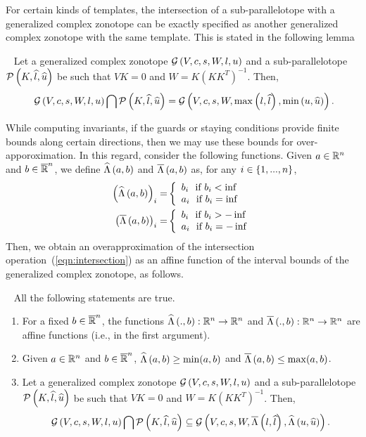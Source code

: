 For certain kinds of templates, the intersection of a
sub-parallelotope with a generalized complex zonotope can be exactly
specified as another generalized complex zonotope with the same
template.  This is stated in the following lemma 
\begin{lemma}~\label{lem:intersection}
  Let a generalized complex zonotope $\mathcal{G}\left(V,c,s,W,l,u\right)$ and a sub-parallelotope
  $\mathcal{P}\left(K,\widehat{l},\widehat{u}\right)$ be such that $VK=0$ and
  $W=K(KK^T)^{-1}$.  Then, 
\begin{equation}~\label{eqn:intersection}
\mathcal{G}\left(V,c,s,W,l,u\right)\bigcap \mathcal{P}\left(K,\widehat{l},\widehat{u}\right) =
  \mathcal{G}\left(V,c,s,W,\max\left(l,\widehat{l}\right),\min\left(u,\widehat{u}\right)\right).
\end{equation}
\end{lemma}

While computing invariants, if the guards or staying conditions
provide finite bounds along certain directions, then we may use these
bounds for over-apporoximation.  In this regard, consider the
following functions.  Given $a\in\mathbb{R}^n$ and $b\in\mathbb{\overline{R}}^n$,
we define $\widehat{\Lambda}\left(a,b\right)$ and $\overline{\Lambda}\left(a,b\right)$ as, for any
$i\in\{1,...,n\}$,
\begin{align}
\left(\widehat{\Lambda}\left(a,b\right)\right)_i= & \left\{
\begin{array}{l}
b_i~~\text{if}~b_i<\inf\\
a_i~~\text{if}~b_i=\inf
\end{array}
\right.\\
\left(\overline{\Lambda}\left(a,b\right)\right)_i= &\left\{
\begin{array}{l}
b_i~~\text{if}~b_i>-\inf\\
a_i~~\text{if}~b_i=-\inf
\end{array}
\right.
\end{align}
%
Then, we obtain an overapproximation of the intersection
operation~(\ref{eqn:intersection}) as an affine function of the
interval bounds of the generalized complex zonotope, as follows.
\begin{lemma}~\label{lem:affineapproximation}
All the following statements are true.
\begin{enumerate}
\item For a fixed $b\in\mathbb{\overline{R}}^n$, the functions
  $\widehat{\Lambda}\left(.,b\right):\mathbb{R}^n\rightarrow\mathbb{R}^n$ and
  $\overline{\Lambda}\left(.,b\right):\mathbb{R}^n\rightarrow\mathbb{R}^n$ are affine functions
  (i.e., in
  the first argument).
\item Given $a\in\mathbb{R}^n$ and $b\in\mathbb{\overline{R}}^n$,
  $\widehat{\Lambda}\left(a,b\right)\geq \min(a,b)$ and $\overline{\Lambda}\left(a,b\right)\leq
  \max(a,b)$.
\item Let a generalized complex zonotope $\mathcal{G}\left(V,c,s,W,l,u\right)$ and a sub-parallelotope
  $\mathcal{P}\left(K,\widehat{l},\widehat{u}\right)$ be such that $VK=0$ and
  $W=K(KK^T)^{-1}$.  Then, \[\mathcal{G}\left(V,c,s,W,l,u\right)\bigcap \mathcal{P}\left(K,\widehat{l},\widehat{u}\right) \subseteq
  \mathcal{G}\left(V,c,s,W,\overline{\Lambda}\left(l,\widehat{l}\right),\widehat{\Lambda}\left(u,\widehat{u}\right)\right).\]
\end{enumerate}
\end{lemma}



